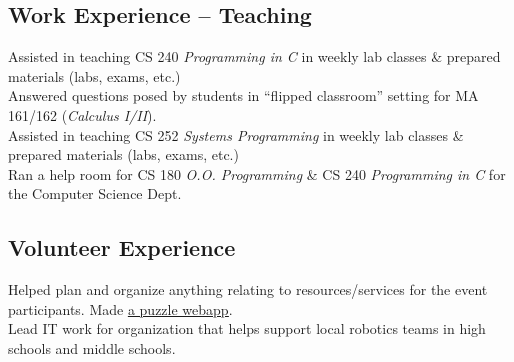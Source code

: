 \documentclass[11pt,letter,sans]{moderncv}
\begin{document}
\subsection{\textbf{Work Experience -- Teaching}}
Assisted in teaching CS 240 \textit{Programming in C} in weekly lab classes \& prepared materials (labs, exams, etc.)
\\
Answered questions posed by students in ``flipped classroom'' setting for MA 161/162 (\textit{Calculus I/II}).
\\
Assisted in teaching CS 252 \textit{Systems Programming} in weekly lab classes \& prepared materials (labs, exams, etc.)
\\
Ran a help room for CS 180 \textit{O.O. Programming} \& CS 240 \textit{Programming in C} for the Computer Science Dept.

\subsection{\textbf{Volunteer Experience}}
Helped plan and organize anything relating to resources/services for the event participants.
Made \href{https://github.com/BoilerMake/puzzles-BM4}{\underline{a puzzle webapp}}.
\\
Lead IT work for organization that helps support local robotics teams in high schools and middle schools.
\end{document}
